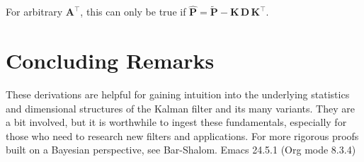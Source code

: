 \documentclass[10pt,oneside,x11names]{article}
\begin{document}
\noindent For arbitrary \(\mathbold{A}^\intercal\), this can only be true if 
\({\hat{\mathbold{P}}} =
{\tilde{\mathbold{P}}} -
\mathbold{K}\,
\mathbold{D}\,
\mathbold{K}^
\intercal\).


\section{Concluding Remarks}
\label{sec:orgheadline15}

These derivations are helpful for gaining intuition into the underlying
statistics and dimensional structures of the Kalman filter and its many
variants. They are a bit involved, but it is worthwhile to ingest these
fundamentals, especially for those who need to research new filters and
applications. For more rigorous proofs built on a Bayesian perspective, see
Bar-Shalom.\footnotemark[3]{}
Emacs 24.5.1 (Org mode 8.3.4)
\end{document}
